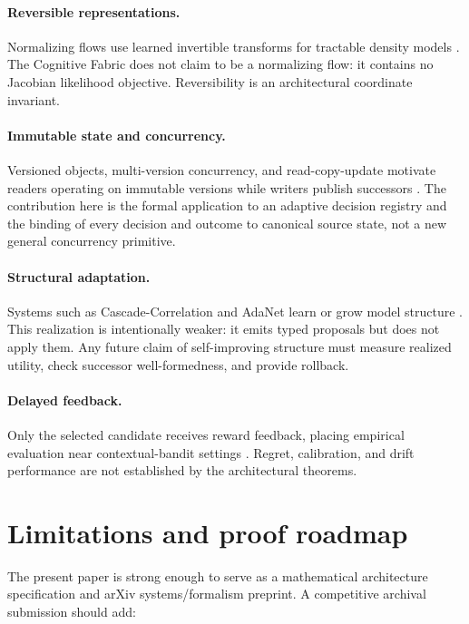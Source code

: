 \documentclass[11pt]{article}
\theoremstyle{definition}
\theoremstyle{plain}
\begin{document}
\paragraph{Reversible representations.}
Normalizing flows use learned invertible transforms for tractable density
models \cite{dinh2016}.  The Cognitive Fabric does not claim to be a
normalizing flow: it contains no Jacobian likelihood objective.  Reversibility
is an architectural coordinate invariant.

\paragraph{Immutable state and concurrency.}
Versioned objects, multi-version concurrency, and read-copy-update motivate
readers operating on immutable versions while writers publish successors
\cite{reed1978,bernstein1983,mckenney1998}.  The contribution here is the
formal application to an adaptive decision registry and the binding of every
decision and outcome to canonical source state, not a new general concurrency
primitive.

\paragraph{Structural adaptation.}
Systems such as Cascade-Correlation and AdaNet learn or grow model structure
\cite{fahlman1989,cortes2017}.  This realization is intentionally weaker:
it emits typed proposals but does not apply them.  Any future claim of
self-improving structure must measure realized utility, check successor
well-formedness, and provide rollback.

\paragraph{Delayed feedback.}
Only the selected candidate receives reward feedback, placing empirical
evaluation near contextual-bandit settings \cite{li2010,chu2011}.  Regret,
calibration, and drift performance are not established by the architectural
theorems.

\section{Limitations and proof roadmap}

The present paper is strong enough to serve as a mathematical architecture
specification and arXiv systems/formalism preprint.  A competitive archival
submission should add:
\end{document}
